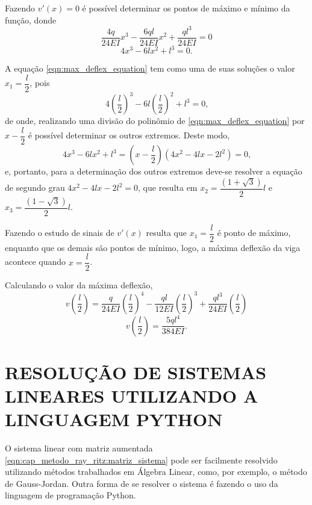 \documentclass[
	12pt,				%
	openright,			%
    twoside,			%
	a4paper,			%
	english,			%
	french,				%
	spanish,			%
	brazil				%
	]{abntex2}
\numberwithin{lema}{chapter}
\numberwithin{teorema}{chapter}
\numberwithin{definicao}{chapter}
\numberwithin{exemplo}{chapter}
\numberwithin{figure}{chapter}
\begin{document}
\begin{apendicesenv}
{	Fazendo $v'(x)=0$ é possível determinar os pontos de máximo e mínimo da função, donde
	$$
		\frac{4q}{24EI}x^3
		-
		\frac{6ql}{24EI}x^2
		+
		\frac{ql^3}{24EI}
		= 0
	$$
	\begin{equation}
		\label{eqn:max_deflex_equation}
		4x^3 - 6lx^2 + l^3 = 0
		\text{.}
	\end{equation}
	
	A equação \eqref{eqn:max_deflex_equation} tem como uma de suas soluções o valor $x_1=\dfrac{l}{2}$, pois
	$$
		4\left (\frac{l}{2}\right )^3 - 6l\left ( \frac{l}{2}\right )^2+l^3=0
		\text{,}
	$$
	de onde, realizando uma divisão do polinômio de \eqref{eqn:max_deflex_equation} por $x-\dfrac{l}{2}$ é possível determinar os outros extremos. Deste modo,
	$$
		4x^3-6lx^2+l^3 = (x-\frac{l}{2})(4x^2-4lx-2l^2)=0
		\text{,}
	$$
	e, portanto, para a determinação dos outros extremos deve-se resolver a equação de segundo grau $4x^2-4lx-2l^2=0$, que resulta em $x_2=\dfrac{(1+\sqrt{3})}{2}l$ e $x_3=\dfrac{(1-\sqrt{3})}{2}l$.
	
	Fazendo o estudo de sinais de $v'(x)$ resulta que $x_1=\dfrac{l}{2}$ é ponto de máximo, enquanto que os demais são pontos de mínimo, logo, a máxima deflexão da viga acontece quando $x=\dfrac{l}{2}$.
	
	Calculando o valor da máxima deflexão,
	$$
		v\left (\frac{l}{2}\right )=
			\frac{q}{24EI} \left (
				\frac{l}{2}
			\right )^4
			-
			\frac{ql}{12EI} \left (
				\frac{l}{2}
			\right )^3
			+
			\frac{ql^3}{24EI}\left (
				\frac{l}{2}
			\right )
	$$
	\begin{equation}
	\label{eqn:max_deflex_resultado}
		v\left (\frac{l}{2}\right )=
			\frac{5ql^4}{384EI}
			\text{.}
	\end{equation}
}

\chapter{RESOLUÇÃO DE SISTEMAS LINEARES UTILIZANDO A LINGUAGEM PYTHON}
\label{apend:res_sis_lin}
{
	O sistema linear com matriz aumentada \eqref{eqn:cap_metodo_ray_ritz:matriz_sistema} pode ser facilmente resolvido utilizando métodos trabalhados em Álgebra Linear, como, por exemplo, o método de Gauss-Jordan. Outra forma de se resolver o sistema é fazendo o uso da linguagem de programação Python.
	
}
\end{apendicesenv}
\end{document}
